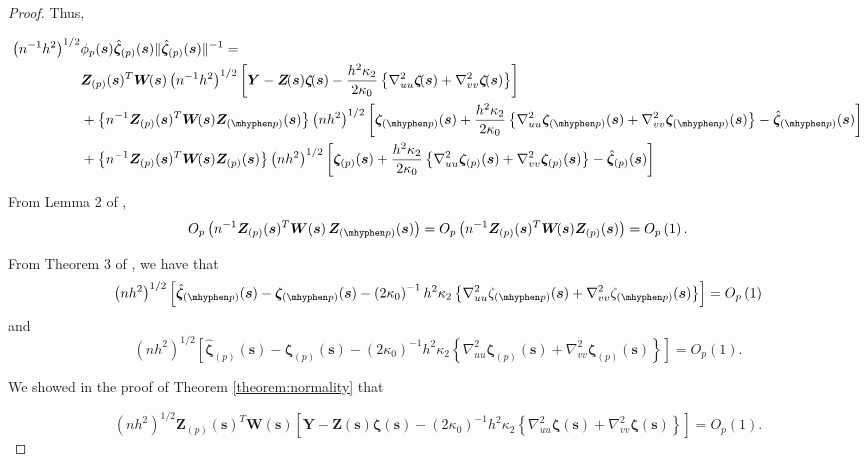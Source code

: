 \documentclass[authoryear,review, 12pt]{elsarticle}
\begin{document}
\begin{proof}
Thus,

\begin{align}
\left(n^{-1}h^{2}\right)^{1/2} & \phi_{p}(\bm{s})\hat{\bm{\zeta}}_{(p)}(\bm{s})\|\hat{\bm{\zeta}}_{(p)}(\bm{s})\|^{-1}=\nonumber \\
 & \bm{Z}_{(p)}(\bm{s})^{T}\bm{W}\!(\bm{s})\left(n^{-1}h^{2}\right)^{1/2}\left[\bm{Y}-\bm{Z}\!(\bm{s})\bm{\zeta}\!(\bm{s})-\frac{h^{2}\kappa_{2}}{2\kappa_{0}}\left\{ \nabla_{uu}^{2}\bm{\zeta}\!(\bm{s})+\nabla_{vv}^{2}\bm{\zeta}\!(\bm{s})\right\} \right]\nonumber \\
 & +\left\{ n^{-1}\bm{Z}_{(p)}(\bm{s})^{T}\bm{W}\!(\bm{s})\bm{Z}_{(\mhyphen p)}(\bm{s})\right\} \left(nh^{2}\right)^{1/2}\left[\bm{\zeta}_{(\mhyphen p)}(\bm{s})+\frac{h^{2}\kappa_{2}}{2\kappa_{0}}\left\{ \nabla_{uu}^{2}\bm{\zeta}_{(\mhyphen p)}(\bm{s})+\nabla_{vv}^{2}\bm{\zeta}_{(\mhyphen p)}(\bm{s})\right\} -\hat{\bm{\zeta}}_{(\mhyphen p)}(\bm{s})\right]\nonumber \\
 & +\left\{ n^{-1}\bm{Z}_{(p)}(\bm{s})^{T}\bm{W}\!(\bm{s})\bm{Z}_{(p)}(\bm{s})\right\} \left(nh^{2}\right)^{1/2}\left[\bm{\zeta}_{(p)}(\bm{s})+\frac{h^{2}\kappa_{2}}{2\kappa_{0}}\left\{ \nabla_{uu}^{2}\bm{\zeta}_{(p)}(\bm{s})+\nabla_{vv}^{2}\bm{\zeta}_{(p)}(\bm{s})\right\} -\hat{\bm{\zeta}}_{(p)}(\bm{s})\right]\label{eq:selection}
\end{align}


From Lemma 2 of \citet{Sun-Yan-Zhang-Lu-2014}, 
\[
O_{p}\left(n^{-1}\bm{Z}_{(p)}(\bm{s})^{T}\bm{W}\!\left(\bm{s}\right)\bm{Z}_{(\mhyphen p)}(\bm{s})\right)=O_{p}\left(n^{-1}\bm{Z}_{(p)}(\bm{s})^{T}\bm{W}\!(\bm{s})\bm{Z}_{(p)}(\bm{s})\right)=O_{p}\left(1\right).
\]


From Theorem 3 of \citet{Sun-Yan-Zhang-Lu-2014}, we have that 
\[
\left(nh^{2}\right)^{1/2}\left[\hat{\bm{\zeta}}_{(\mhyphen p)}(\bm{s})-\bm{\zeta}_{(\mhyphen p)}(\bm{s})-\left(2\kappa_{0}\right)^{-1}h^{2}\kappa_{2}\left\{ \nabla_{uu}^{2}\zeta_{(\mhyphen p)}(\bm{s})+\nabla_{vv}^{2}\zeta_{(\mhyphen p)}(\bm{s})\right\} \right]=O_{p}\left(1\right)
\]
 and 
\[
\left(nh^{2}\right)^{1/2}\left[\hat{\bm{\zeta}}_{(p)}(\bm{s})-\bm{\zeta}_{(p)}(\bm{s})-\left(2\kappa_{0}\right)^{-1}h^{2}\kappa_{2}\left\{ \nabla_{uu}^{2}\bm{\zeta}_{(p)}(\bm{s})+\nabla_{vv}^{2}\bm{\zeta}_{(p)}(\bm{s})\right\} \right]=O_{p}\left(1\right).
\]


We showed in the proof of Theorem \ref{theorem:normality} that

\[
\left(nh^{2}\right)^{1/2}\bm{Z}_{(p)}(\bm{s})^{T}\bm{W}\!(\bm{s})\left[\bm{Y}-\bm{Z}\!(\bm{s})\bm{\zeta}(\bm{s})-\left(2\kappa_{0}\right)^{-1}h^{2}\kappa_{2}\left\{ \nabla_{uu}^{2}\bm{\zeta}(\bm{s})+\nabla_{vv}^{2}\bm{\zeta}(\bm{s})\right\} \right]=O_{p}\left(1\right).
\]



\end{proof}
\end{document}
